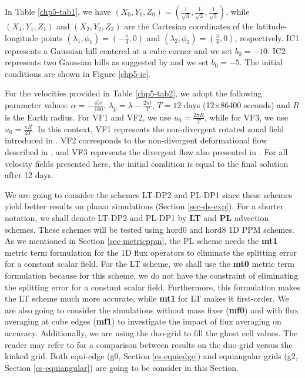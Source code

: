 In Table \ref{chp5-tab1}, we have $(X_0,Y_0,Z_0)=(\frac{1}{\sqrt{3}},\frac{1}{\sqrt{3}},\frac{1}{\sqrt{3}})$, while 
$(X_1,Y_1,Z_1)$ and $(X_2,Y_2,Z_2)$ are the Cartesian coordinates of the latitude-longitude points
$(\lambda_1,\phi_1) = (-\frac{\pi}{4},0)$ and
$(\lambda_2,\phi_2) = ( \frac{\pi}{4},0)$, respectively.
IC1 represents a Gaussian hill centered at a cube corner and we set $b_0 = -10$.
IC2 represents two Gaussian hills as suggested by \citet{nair:2010} and we set $b_0 = -5$.
The initial conditions are shown in Figure \ref{chp5-ic}.

For the velocities provided in Table \ref{chp5-tab2}, we adopt the following parameter values: 
$\alpha=-\frac{45\pi}{180}$, $\lambda_p=\lambda-\frac{2\pi t}{T}$, $T=12$ days (12$\times$86400 seconds) and $R$ is the Earth radius.
For VF1 and VF2, we use $u_0 = \frac{2\pi R}{T}$, while for VF3, we use $u_0 = \frac{\pi R}{2T}$.
In this context, VF1 represents the non-divergent rotated zonal field introduced in \citet{will:1992}.
VF2 corresponds to the non-divergent deformational flow described in \citet{nair:2010},
and VF3 represents the divergent flow also presented in \citet{nair:2010}.
For all velocity fields presented here, the initial condition is equal to the final solution after 12 days.

We are going to consider the schemes LT-DP2 and PL-DP1 since these schemes yield better results on planar simulations (Section \ref{sec-ds-exp}).
For a shorter notation, we shall denote LT-DP2 and PL-DP1 by \textbf{LT} and \textbf{PL} advection schemes. 
These schemes will be tested using hord0 and hord8 1D PPM schemes.
As we mentioned in Section \ref{sec-metricppm}, the PL scheme needs the \textbf{mt1} 
metric term formulation for the 1D flux operators to eliminate the splitting error for a constant scalar field.
For the LT scheme, we shall use the \textbf{mt0} metric term formulation because for this scheme, 
we do not have the constraint of eliminating the splitting error for a constant scalar field. 
Furthermore, this formulation makes the LT scheme much more accurate, while \textbf{mt1} for LT makes it first-order.
We are also going to consider the simulations without mass fixer (\textbf{mf0}) and with flux averaging at
cube edges (\textbf{mf1}) to investigate the impact of flux averaging on accuracy.
Additionally, we are using the duo-grid to fill the ghost cell values.
The reader may refer to \citet{mouallem:2023} for a comparison between results on the duo-grid versus the kinked grid.
Both equi-edge (g0, Section \ref{cs-equiedge}) and equiangular grids (g2, Section \ref{cs-equiangular}) are going to be consider in this Section.

